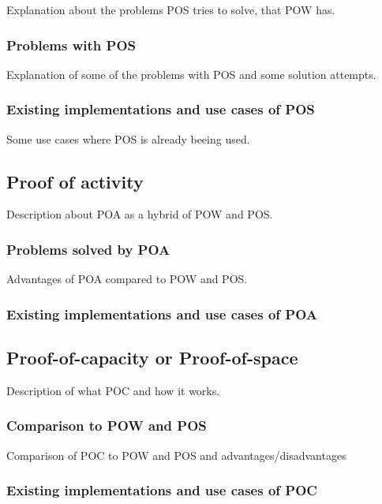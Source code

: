 \documentclass{acm_proc_article-sp}
\begin{document}
Explanation about the problems POS tries to solve, that POW has.


\subsubsection{Problems with POS}

Explanation of some of the problems with POS and some solution attempts.


\subsubsection{Existing implementations and use cases of POS}

Some use cases where POS is already beeing used.


\subsection{Proof of activity}

Description about POA as a hybrid of POW and POS.


\subsubsection{Problems solved by POA}

Advantages of POA compared to POW and POS.


\subsubsection{Existing implementations and use cases of POA}


\subsection{Proof-of-capacity or Proof-of-space}

Description of what POC and how it works.


\subsubsection{Comparison to POW and POS}

Comparison of POC to POW and POS and advantages/disadvantages


\subsubsection{Existing implementations and use cases of POC}
\end{document}
